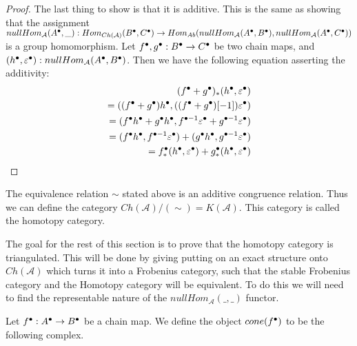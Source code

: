 \begin{proof}
        The last thing to show is that it is additive. This is the same as showing that the assignment $nullHom_{\mathcal{A}}(A^{\bullet},\_):Hom_{Ch(\mathcal{A})}(B^{\bullet},C^{\bullet})\rightarrow Hom_{Ab}(nullHom_{\mathcal{A}}(A^{\bullet},B^{\bullet}),nullHom_{\mathcal{A}}(A^{\bullet},C^{\bullet}))$ is a group homomorphism. Let $f^{\bullet},g^{\bullet}:B^{\bullet}\rightarrow C^{\bullet}$ be two chain maps, and $(h^{\bullet},\varepsilon^{\bullet}):nullHom_{\mathcal{A}}(A^{\bullet},B^{\bullet})$. Then we have the following equation asserting the additivity:
        \begin{align*}
            (f^{\bullet}+g^{\bullet})_*(h^{\bullet},\varepsilon^{\bullet})\\
            =((f^{\bullet}+g^{\bullet})h^{\bullet},((f^{\bullet}+g^{\bullet})[-1])\varepsilon^{\bullet})\\
            =(f^{\bullet}h^{\bullet}+g^{\bullet}h^{\bullet},f^{\bullet-1}\varepsilon^{\bullet}+g^{\bullet-1}\varepsilon^{\bullet})\\
            =(f^{\bullet}h^{\bullet},f^{\bullet-1}\varepsilon^{\bullet})+(g^{\bullet}h^{\bullet},g^{\bullet-1}\varepsilon^{\bullet})\\
            =f^{\bullet}_*(h^{\bullet},\varepsilon^{\bullet})+g^{\bullet}_*(h^{\bullet},\varepsilon^{\bullet})
        \end{align*}
    \end{proof}

    \begin{corollary}
        The equivalence relation $\sim$ stated above is an additive congruence relation. Thus we can define the category $Ch(\mathcal{A})/(\sim) = K(\mathcal{A})$. This category is called the homotopy category.
    \end{corollary}

    The goal for the rest of this section is to prove that the homotopy category is triangulated. This will be done by giving putting on an exact structure onto $Ch(\mathcal{A})$ which turns it into a Frobenius category, such that the stable Frobenius category and the Homotopy category will be equivalent. To do this we will need to find the representable nature of the $nullHom_{\mathcal{A}}(\_,\_)$ functor.

    \begin{definition}
        Let $f^{\bullet}:A^{\bullet}\rightarrow B^{\bullet}$ be a chain map. We define the object $cone(f^{\bullet})$ to be the following complex.
        \begin{center}
        \end{center}
    \end{definition}

